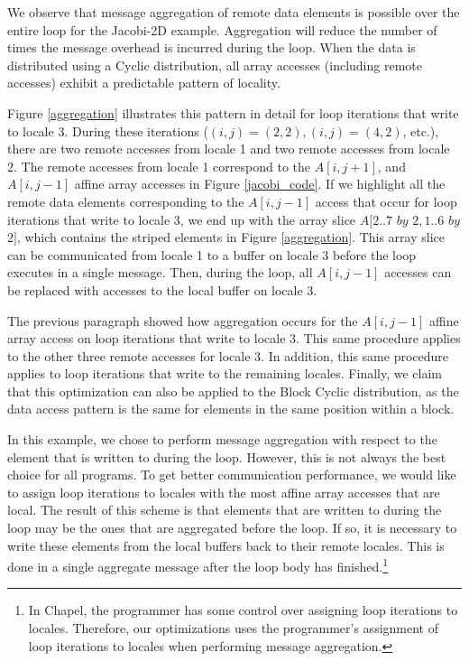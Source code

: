 We observe that message aggregation of remote data elements is possible over the entire loop for the Jacobi-2D example. Aggregation will reduce the number of times the message overhead is incurred during the loop. When the data is distributed using a Cyclic distribution, all array accesses (including remote accesses) exhibit a predictable pattern of locality. 

Figure \ref{aggregation} illustrates this pattern in detail for loop iterations that write to locale 3. During these iterations ($(i, j) = (2, 2), (i, j) = (4, 2)$, etc.), there are two remote accesses from locale 1 and two remote accesses from locale 2. The remote accesses from locale 1 correspond to the $A[i, j+1]$, and $A[i, j-1]$ affine array accesses in Figure \ref{jacobi_code}. If we highlight all the remote data elements corresponding to the $A[i, j-1]$ access that occur for loop iterations that write to locale 3, we end up with the array slice $A[2..7$ $by$ $2, 1..6$ $by$ $2]$, which contains the striped elements in Figure \ref{aggregation}. This array slice can be communicated from locale 1 to a buffer on locale 3 before the loop executes in a single message. Then, during the loop, all $A[i, j-1]$ accesses can be replaced with accesses to the local buffer on locale 3. 

The previous paragraph showed how aggregation occurs for the $A[i, j-1]$ affine array access on loop iterations that write to locale 3. This same procedure applies to the other three remote accesses for locale 3. In addition, this same procedure applies to loop iterations that write to the remaining locales. Finally, we claim that this optimization can also be applied to the Block Cyclic distribution, as the data access pattern is the same for elements in the same position within a block. 

In this example, we chose to perform message aggregation with respect to the element that is written to during the loop. However, this is not always the best choice for all programs. To get better communication performance, we would like to assign loop iterations to locales with the most affine array accesses that are local. The result of this scheme is that elements that are written to during the loop may be the ones that are aggregated before the loop. If so, it is necessary to write these elements from the local buffers back to their remote locales. This is done in a single aggregate message after the loop body has finished.\footnote{In Chapel, the programmer has some control over assigning loop iterations to locales. Therefore, our optimizations uses the programmer's assignment of loop iterations to locales when performing message aggregation.} 

